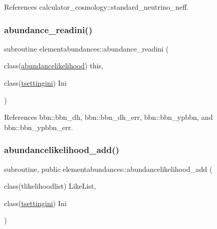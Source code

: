 References calculator\+\_\+cosmology\+::standard\+\_\+neutrino\+\_\+neff.

\mbox{\label{namespaceelementabundances_a72d18f9f5d0b7db26c7bca022a12e566}} 
\subsubsection{\texorpdfstring{abundance\+\_\+readini()}{abundance\_readini()}}
{\footnotesize\ttfamily subroutine elementabundances\+::abundance\+\_\+readini (\begin{DoxyParamCaption}\item[{class(\mbox{\hyperlink{structelementabundances_1_1abundancelikelihood}{abundancelikelihood}})}]{this,  }\item[{class(\mbox{\hyperlink{structsettings_1_1tsettingini}{tsettingini}})}]{Ini }\end{DoxyParamCaption})\hspace{0.3cm}{\ttfamily [private]}}



References bbn\+::bbn\+\_\+dh, bbn\+::bbn\+\_\+dh\+\_\+err, bbn\+::bbn\+\_\+ypbbn, and bbn\+::bbn\+\_\+ypbbn\+\_\+err.

\mbox{\label{namespaceelementabundances_ab38dda4bf7a9aec310c4b1f93a4b51b0}} 
\subsubsection{\texorpdfstring{abundancelikelihood\+\_\+add()}{abundancelikelihood\_add()}}
{\footnotesize\ttfamily subroutine, public elementabundances\+::abundancelikelihood\+\_\+add (\begin{DoxyParamCaption}\item[{class(tlikelihoodlist)}]{Like\+List,  }\item[{class(\mbox{\hyperlink{structsettings_1_1tsettingini}{tsettingini}})}]{Ini }\end{DoxyParamCaption})}



